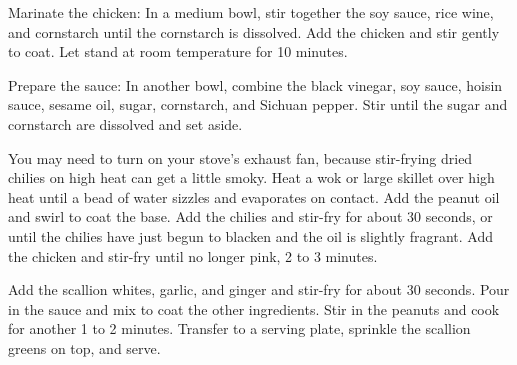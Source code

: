 
Marinate the chicken: In a medium bowl, stir together the soy sauce, rice wine, and cornstarch until the cornstarch is dissolved. Add the chicken and stir gently to coat. Let stand at room temperature for 10 minutes.

Prepare the sauce: In another bowl, combine the black vinegar, soy sauce, hoisin sauce, sesame oil, sugar, cornstarch, and Sichuan pepper. Stir until the sugar and cornstarch are dissolved and set aside.

You may need to turn on your stove's exhaust fan, because stir-frying dried chilies on high heat can get a little smoky. Heat a wok or large skillet over high heat until a bead of water sizzles and evaporates on contact. Add the peanut oil and swirl to coat the base. Add the chilies and stir-fry for about 30 seconds, or until the chilies have just begun to blacken and the oil is slightly fragrant. Add the chicken and stir-fry until no longer pink, 2 to 3 minutes.

Add the scallion whites, garlic, and ginger and stir-fry for about 30 seconds. Pour in the sauce and mix to coat the other ingredients. Stir in the peanuts and cook for another 1 to 2 minutes. Transfer to a serving plate, sprinkle the scallion greens on top, and serve.
